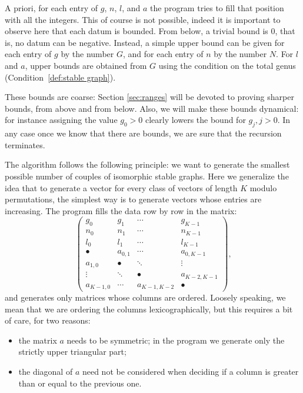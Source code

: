 \documentclass{amsart}
\theoremstyle{plain}
\theoremstyle{definition}
\begin{document}


A priori, for each entry of $g$, $n$, $l$, and $a$ the program tries
to fill that position with all the integers. This of course is not
possible, indeed it is important to observe here that each datum is
bounded. From below, a trivial bound is $0$, that is, no datum can be
negative. Instead, a simple upper bound can be given for each entry of
$g$ by the number $G$, and for each entry of $n$ by the number
$N$. For $l$ and $a$, upper bounds are obtained from $G$ using the
condition on the total genus (Condition~\ref{def:stable graph}).

These bounds are coarse: Section \ref{sec:ranges} will be devoted to
proving sharper bounds, from above and from below. Also, we will make
these bounds dynamical: for instance assigning the value $g_0 > 0$
clearly lowers the bound for $g_j, j > 0$. In any case once we know
that there are bounds, we are sure that the recursion terminates.

The algorithm follows the following principle: we want to generate the
smallest possible number of couples of isomorphic stable graphs. Here
we generalize the idea that to generate a vector for every class of
vectors of length $K$ modulo permutations, the simplest way is to
generate vectors whose entries are increasing. The program fills the
data row by row in the matrix:
\begin{equation}\label{eq:big matrix}
  \begin{pmatrix}
    g_0 & g_1 & \cdots & g_{K-1}\\
    n_0 & n_1 & \cdots & n_{K-1}\\
    l_0 & l_1 & \cdots & l_{K-1}\\
    \hline
    \bullet & a_{0,1} & \cdots & a_{0,K-1}\\
    a_{1,0} & \bullet & \ddots & \vdots\\
    \vdots & \ddots & \bullet & a_{K-2,K-1}\\
    a_{K-1,0} & \cdots & a_{K-1,K-2} & \bullet
  \end{pmatrix}\text{,}
\end{equation}
and generates only matrices whose columns are ordered. Loosely
speaking, we mean that we are ordering the columns lexicographically,
but this requires a bit of care, for two reasons:
\begin{itemize}
\item the matrix $a$ needs to be symmetric; in the program we generate
  only the strictly upper triangular part;
\item the diagonal of $a$ need not be considered when deciding if a
  column is greater than or equal to the previous one.
\end{itemize}
\end{document}
